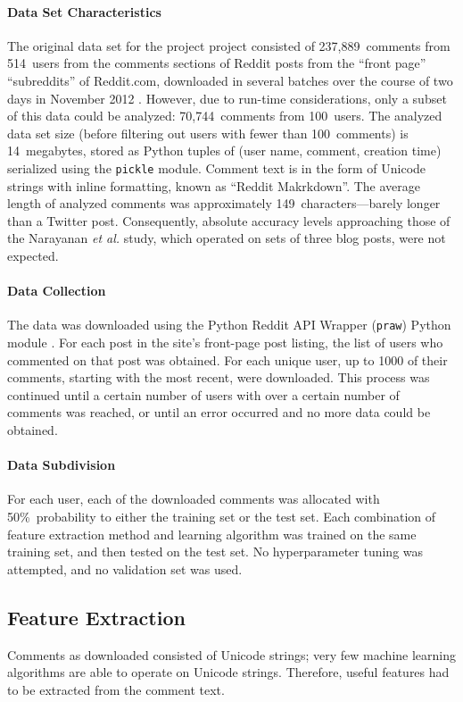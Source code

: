 \documentclass{article}
\begin{document}
\paragraph{Data Set Characteristics}
The original data set for the project project consisted of 237,889~comments from 514~users from the comments sections of Reddit posts from the ``front page'' ``subreddits'' of Reddit.com, downloaded in several batches over the course of two days in November 2012 \cite{reddit2012reddit}. However, due to run-time considerations, only a subset of this data could be analyzed: 70,744~comments from 100~users. The analyzed data set size (before filtering out users with fewer than 100~comments) is 14~megabytes, stored as Python tuples of (user name, comment, creation time) serialized using the \texttt{pickle} module. Comment text is in the form of Unicode strings with inline formatting, known as ``Reddit Makrkdown''. The average length of analyzed comments was  approximately 149~characters---barely longer than a Twitter post. Consequently, absolute accuracy levels approaching those of the Narayanan \textit{et al.} study, which operated on sets of three blog posts, were not expected.

\paragraph{Data Collection}
The data was downloaded using the Python Reddit API Wrapper (\texttt{praw}) Python module \cite{boe2012python}. For each post in the site's front-page post listing, the list of users who commented on that post was obtained. For each unique user, up to 1000 of their comments, starting with the most recent, were downloaded. This process was continued until a certain number of users with over a certain number of comments was reached, or until an error occurred and no more data could be obtained.

\paragraph{Data Subdivision}
For each user, each of the downloaded comments was allocated with 50\%~probability to either the training set or the test set. Each combination of feature extraction method and learning algorithm was trained on the same training set, and then tested on the test set. No hyperparameter tuning was attempted, and no validation set was used.

\subsection{Feature Extraction}
Comments as downloaded consisted of Unicode strings; very few machine learning algorithms are able to operate on Unicode strings. Therefore, useful features had to be extracted from the comment text.
\end{document}
